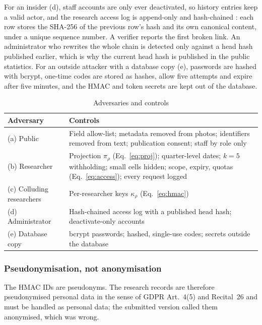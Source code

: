 \documentclass{ieeeaccess}
\begin{document}
For an insider (d), staff accounts are only ever deactivated, so history entries keep a valid actor, and the research access log is append-only and hash-chained \cite{b50,b52}: each row stores the SHA-256 of the previous row's hash and its own canonical content, under a unique sequence number. A verifier reports the first broken link. An administrator who rewrites the whole chain is detected only against a head hash published earlier, which is why the current head hash is published in the public statistics. For an outside attacker with a database copy (e), passwords are hashed with bcrypt, one-time codes are stored as hashes, allow five attempts and expire after five minutes, and the HMAC and token secrets are kept out of the database.

\begin{table}[!tb]
\caption{Adversaries and controls}
\label{tab:t6}
\centering
\footnotesize
\setlength{\tabcolsep}{3pt}
\begin{tabular}{@{}p{1.6cm}p{5.5cm}@{}}
\toprule
Adversary & Controls\\
\midrule
(a) Public & Field allow-list; metadata removed from photos; identifiers removed from text; publication consent; staff by role only\\
(b) Researcher & Projection $\pi_\rho$ (Eq.~\ref{eq:proj}); quarter-level dates; $k=5$ withholding; small cells hidden; scope, expiry, quotas (Eq.~\ref{eq:access}); every request logged\\
(c) Colluding researchers & Per-researcher keys $\kappa_\rho$ (Eq.~\ref{eq:hmac})\\
(d) Administrator & Hash-chained access log with a published head hash; deactivate-only accounts\\
(e) Database copy & bcrypt passwords; hashed, single-use codes; secrets outside the database\\
\bottomrule
\end{tabular}
\end{table}

\subsubsection{Pseudonymisation, not anonymisation}
The HMAC IDs are pseudonyms. The research records are therefore pseudonymised personal data in the sense of GDPR Art.~4(5) and Recital~26 \cite{b47,b46} and must be handled as personal data; the submitted version called them anonymised, which was wrong.
\end{document}
